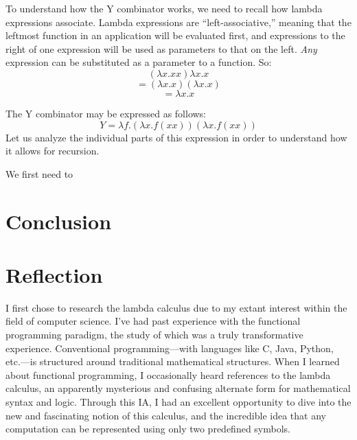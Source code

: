 \documentclass[twocolumn,titlepage,12pt]{article}
\begin{document}
To understand how the Y combinator works, we need to recall how lambda expressions associate. Lambda expressions are ``left-associative,'' meaning that the leftmost function in an application will be evaluated first, and expressions to the right of one expression will be used as parameters to that on the left. \textit{Any} expression can be substituted as a parameter to a function. So:
$$(\lambda x.xx)\lambda x.x$$
$$=(\lambda x.x)(\lambda x.x)$$
$$=\lambda x.x$$

The Y combinator may be expressed as follows:
$$Y=\lambda f.(\lambda x.f(x x))(\lambda x.f(x x))$$
Let us analyze the individual parts of this expression in order to understand how it allows for recursion.

We first need to

\section{Conclusion}


\section{Reflection}
I first chose to research the lambda calculus due to my extant interest within the field of computer science. I've had past experience with the functional programming paradigm, the study of which was a truly transformative experience. Conventional programming---with languages like C, Java, Python, etc.---is structured around traditional mathematical structures. When I learned about functional programming, I occasionally heard references to the lambda calculus, an apparently mysterious and confusing alternate form for mathematical syntax and logic.
Through this IA, I had an excellent opportunity to dive into the new and fascinating notion of this calculus, and the incredible idea that any computation can be represented using only two predefined symbols.


\end{document}

